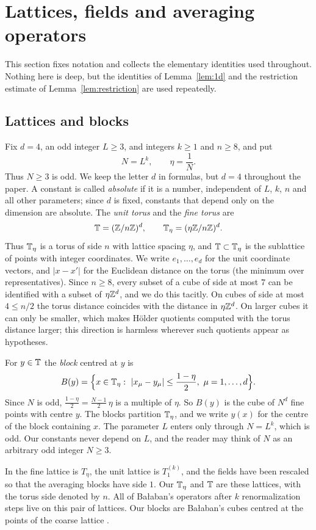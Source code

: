 \section{Lattices, fields and averaging operators}\label{sec:setup}

This section fixes notation and collects the elementary identities used throughout. Nothing here is deep, but the identities of Lemma~\ref{lem:1d} and the restriction estimate of Lemma~\ref{lem:restriction} are used repeatedly.

\subsection{Lattices and blocks}\label{ss:2.1}

Fix $d=4$, an odd integer $L\ge3$, and integers $k\ge1$ and $n\ge8$, and put
\[
N=L^k,\qquad \eta=\frac1N .
\]
Thus $N\ge3$ is odd. We keep the letter $d$ in formulas, but $d=4$ throughout the paper. A constant is called \emph{absolute} if it is a number, independent of $L$, $k$, $n$ and all other parameters; since $d$ is fixed, constants that depend only on the dimension are absolute. The \emph{unit torus} and the \emph{fine torus} are
\[
\mathbb T=(\mathbb Z/n\mathbb Z)^d,\qquad \mathbb T_\eta=(\eta\mathbb Z/n\mathbb Z)^d .
\]
Thus $\mathbb T_\eta$ is a torus of side $n$ with lattice spacing $\eta$, and $\mathbb T\subset\mathbb T_\eta$ is the sublattice of points with integer coordinates. We write $e_1,\dots,e_d$ for the unit coordinate vectors, and $|x-x'|$ for the Euclidean distance on the torus (the minimum over representatives). Since $n\ge8$, every subset of a cube of side at most $7$ can be identified with a subset of $\eta\mathbb Z^d$, and we do this tacitly. On cubes of side at most $4\le n/2$ the torus distance coincides with the distance in $\eta\mathbb Z^d$. On larger cubes it can only be smaller, which makes H\"older quotients computed with the torus distance larger; this direction is harmless wherever such quotients appear as hypotheses.

For $y\in\mathbb T$ the \emph{block} centred at $y$ is
\[
B(y)=\Big\{x\in\Tf:\ |x_\mu-y_\mu|\le\frac{1-\eta}2,\ \mu=1,\dots,d\Big\}.
\]
Since $N$ is odd, $\frac{1-\eta}2=\frac{N-1}2\,\eta$ is a multiple of $\eta$. So $B(y)$ is the cube of $N^d$ fine points with centre $y$. The blocks partition $\mathbb T_\eta$, and we write $y(x)$ for the centre of the block containing $x$. The parameter $L$ enters only through $N=L^k$, which is odd. Our constants never depend on $L$, and the reader may think of $N$ as an arbitrary odd integer $N\ge3$.

\begin{remark}\label{x:2.1}
In \cite{BalPropI} the fine lattice is $T_\eta$, the unit lattice is $T_1^{(k)}$, and the fields have been rescaled so that the averaging blocks have side $1$. Our $\mathbb T_\eta$ and $\mathbb T$ are these lattices, with the torus side denoted by $n$. All of Ba\l aban's operators after $k$ renormalization steps live on this pair of lattices. Our blocks are Ba\l aban's cubes centred at the points of the coarse lattice \cite[(0.1)--(0.3)]{BalYM4I}.
\end{remark}

